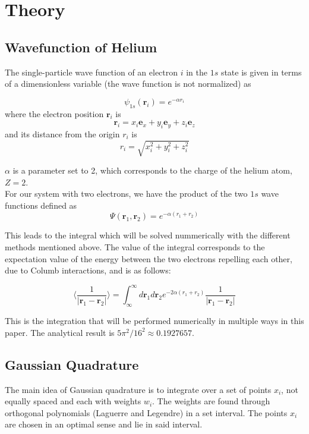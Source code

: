 \documentclass[../main.tex]{subfiles}
\begin{document}
\section{Theory} \label{sec:theory}
\subsection{Wavefunction of Helium} \label{sec:QMProb}
The single-particle wave function of an electron $i$ in the $1s$ state is given in terms of a dimensionless variable (the wave function is not normalized) as

\[\psi_{1s}(\mathbf{r}_i) = e^{-\alpha r_i}\]
where the electron position $\mathbf{r}_i$ is
\[\mathbf{r}_i = x_i \mathbf{e}_x + y_i \mathbf{e}_y + z_i \mathbf{e}_z\]
and its distance from the origin $r_i$ is
\[r_i = \sqrt{x_i^2 + y_i^2 + z_i^2}\]

$\alpha$ is a parameter set to 2, which corresponds to the charge of the helium atom, $Z = 2$. \cite{Hjorth-Jensen2019}\\

For our system with two electrons, we have the product of the two $1s$ wave functions defined as
\[\Psi(\mathbf{r}_1, \mathbf{r}_2) = e^{-\alpha(r_1 + r_2)}\]

This leads to the integral which will be solved nummerically with the  different methods mentioned above. The value of the integral corresponds to the expectation value of the  energy between the two electrons repelling each other, due to Columb interactions, and is as follows:

\begin{equation}
  \langle \frac{1}{|\mathbf{r}_1 - \mathbf{r}_2|} \rangle = \int_{\infty}^\infty d\mathbf{r}_1 d\mathbf{r}_2 e^{-2\alpha(r_1 + r_2)} \frac{1}{|\mathbf{r}_1 - \mathbf{r}_2|}
  \label{eq:int-to-solve}
\end{equation}

This is the integration that will be performed numerically in multiple ways in this paper. The analytical result is $5\pi^2/16^2 \approx 0.1927657$.

\subsection{Gaussian Quadrature} \label{sec:GQ}
The main idea of Gaussian quadrature is to integrate over a set of points $x_i$, not equally spaced and each with weights $w_i$. The weights are found through orthogonal polynomials (Laguerre and Legendre) in a set interval. The points $x_i$ are chosen in an optimal sense and lie in said interval. \\
\end{document}
